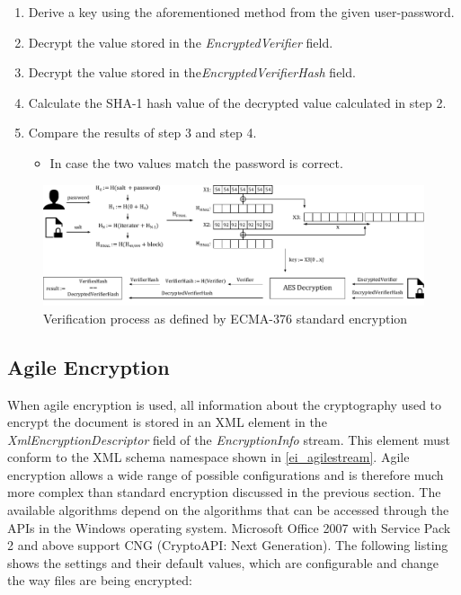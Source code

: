 \documentclass[11pt,oneside]{fithesis2}
\begin{document}
\begin{enumerate}
\setlength\itemsep{0.1em}
\item{Derive a key using the aforementioned method from the given user-password.}
\item{Decrypt the value stored in the \textit{EncryptedVerifier} field.}
\item{Decrypt the value stored in the\textit{EncryptedVerifierHash} field.}
\item{Calculate the SHA-1 hash value of the decrypted value calculated in step 2.}
\item{Compare the results of step 3 and step 4. 
	\begin{itemize}
		\item{In case the two values match the password is correct.}
	\end{itemize}}
\end{enumerate}

\begin{figure}[ht]
	\centering
	\includegraphics[width=1\textwidth]{figures/standard_encryption_scheme.pdf}
	\caption{Verification process as defined by ECMA-376 standard encryption}
	\label{standard_encryption_scheme}
\end{figure}

\subsection{Agile Encryption}

When agile encryption is used, all information about the cryptography used to encrypt the document is stored in an XML element in the \textit{XmlEncryptionDescriptor} field of the \textit{EncryptionInfo} stream. This element must conform to the XML schema namespace shown in \ref{ei_agilestream}. Agile encryption allows a wide range of possible configurations and is therefore much more complex than standard encryption discussed in the previous section. The available algorithms depend on the algorithms that can be accessed through the APIs in the Windows operating system. Microsoft Office 2007 with Service Pack 2 and above support CNG (CryptoAPI: Next Generation). The following listing shows the settings and their default values, which are configurable and change the way files are being encrypted:
\end{document}
